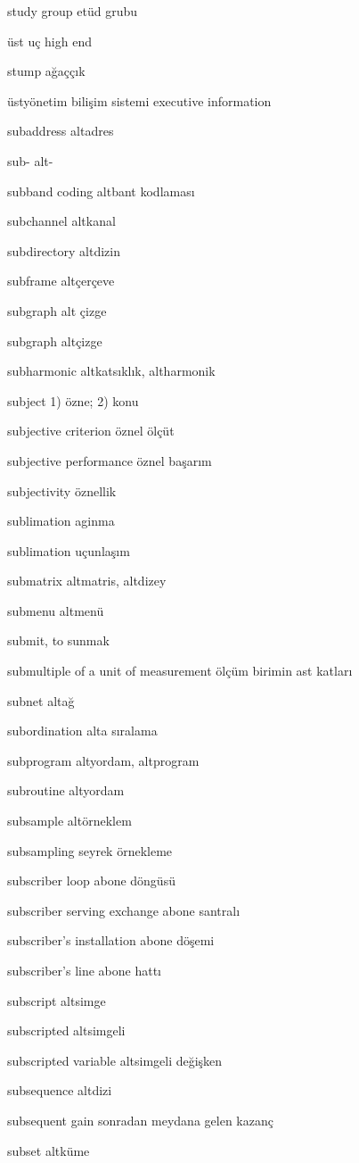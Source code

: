 \documentclass[12pt,fleqn]{article}\usepackage{../../common}
\begin{document}
study group etüd grubu

üst uç high end

stump ağaççık

üstyönetim bilişim sistemi executive information

subaddress altadres

sub- alt-

subband coding altbant kodlaması

subchannel altkanal

subdirectory altdizin

subframe altçerçeve

subgraph alt çizge

subgraph altçizge

subharmonic altkatsıklık, altharmonik

subject 1) özne; 2) konu

subjective criterion öznel ölçüt

subjective performance öznel başarım

subjectivity öznellik

sublimation aginma

sublimation uçunlaşım

submatrix altmatris, altdizey

submenu altmenü

submit, to sunmak

submultiple of a unit of measurement ölçüm birimin ast katları

subnet altağ

subordination alta sıralama

subprogram altyordam, altprogram

subroutine altyordam

subsample altörneklem

subsampling seyrek örnekleme

subscriber loop abone döngüsü

subscriber serving exchange abone santralı

subscriber's installation abone döşemi

subscriber's line abone hattı

subscript altsimge

subscripted altsimgeli

subscripted variable altsimgeli değişken

subsequence altdizi

subsequent gain sonradan meydana gelen kazanç

subset altküme
\end{document}
